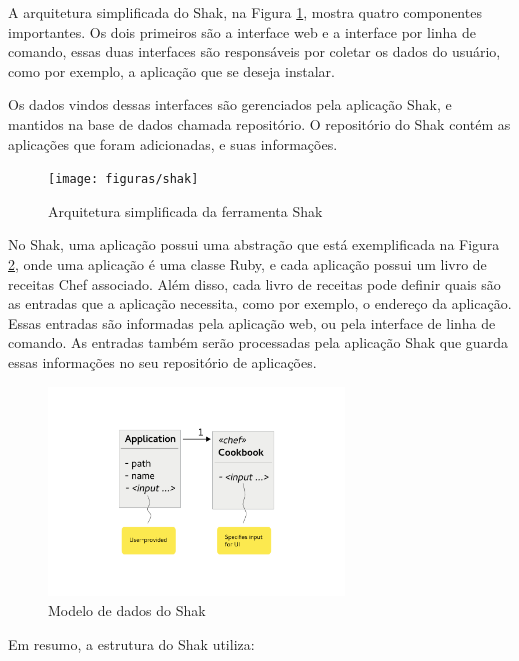 A arquitetura simplificada do Shak, na Figura \ref{fig:shak}, mostra quatro
componentes importantes. Os dois primeiros são a interface web e a interface
por linha de comando, essas duas interfaces são responsáveis por coletar os
dados do usuário, como por exemplo, a aplicação que se deseja instalar.

Os dados vindos dessas interfaces são gerenciados pela aplicação Shak, e mantidos
na base de dados chamada repositório. O repositório do Shak contém as aplicações
que foram adicionadas, e suas informações.

\begin{figure}[h]
  \centering
  \texttt{[image: figuras/shak]}
      \caption{Arquitetura simplificada da ferramenta Shak}
  \label{fig:shak}
\end{figure}

No Shak, uma aplicação possui uma abstração que está exemplificada na Figura \ref{fig:shak2},
onde uma aplicação é uma classe Ruby, e cada aplicação possui um livro de receitas
Chef associado. Além disso, cada livro de receitas pode definir quais são as entradas que
a aplicação necessita, como por exemplo, o endereço da aplicação. Essas entradas
são informadas pela aplicação web, ou pela interface de linha de comando. As entradas 
também serão processadas pela aplicação Shak que guarda essas informações no
seu repositório de aplicações. 

\begin{figure}[h]
  \centering
  \includegraphics[width=0.7\textwidth]
      {figuras/data-model}
      \caption{Modelo de dados do Shak}
  \label{fig:shak2}
\end{figure}

Em resumo, a estrutura do Shak utiliza:

